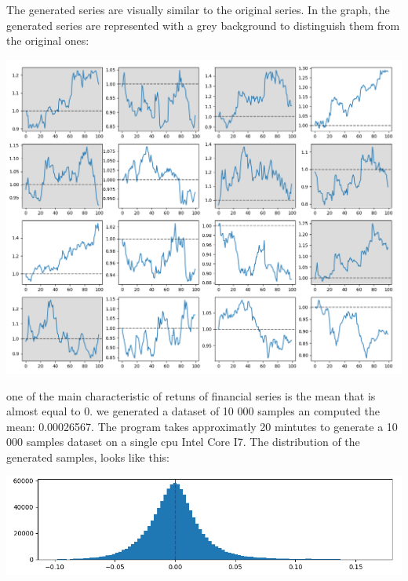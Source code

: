 \documentclass{article}
\begin{document}
    \newpage
    The generated series are visually similar to the original series. In the graph, the generated series are represented with a grey background to distinguish them from the original ones:
    \begin{center}
        \includegraphics[scale=0.3]{imgs/riccardo/series_comparison_README.png}
    \end{center}
    one of the main characteristic of retuns of financial series is the mean that is almost equal to 0. we generated a dataset of 10 000 samples an computed the mean: 0.00026567.
    The program takes approximatly 20 mintutes to generate a 10 000 samples dataset on a single cpu Intel Core I7. The distribution of the generated samples, looks like this:
    \begin{center}
        \includegraphics[scale=0.7]{imgs/riccardo/generated.png}
    \end{center}
    
\end{document}
